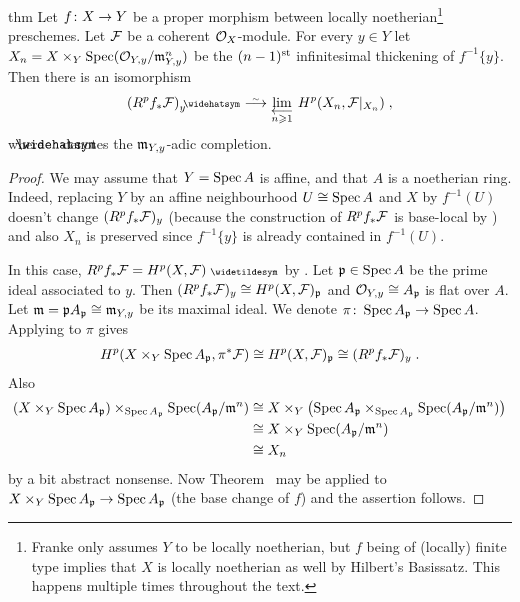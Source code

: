 \documentclass[a4paper,parskip=half,numbers=enddot, DIV=12]{scrreprt}
\renewcommand{\geq}{\geqslant}
\begin{document}
\begin{varthm}{thm}
	Let $f\colon X\morphism Y$ be a proper morphism between locally noetherian\footnote{Franke only assumes $Y$ to be locally noetherian, but $f$ being of (locally) finite type implies that $X$ is locally noetherian as well by Hilbert's Basissatz. This happens multiple times throughout the text.} preschemes. Let $\mathcal{F}$ be a coherent $\mathcal{O}_X$-module. For every $y\in Y$ let $X_n=X\times_Y\operatorname{Spec} (\mathcal{O}_{Y,y}/\mathfrak{m}_{Y,y}^n)$ be the $(n-1)^{\text{st}}$ infinitesimal thickening of $f^{-1}\{y\}$. Then there is an isomorphism
	\begin{align*}
		(R^pf_*\Ff)_y^\complete\isomorphism\limit[n\geq 1] H^p(X_n,\Ff|_{X_n})\;,
	\end{align*}
	where $\roof{\phantom{x}}$ denotes the $\mathfrak{m}_{Y,y}$-adic completion.
\end{varthm}
\begin{proof}
	We may assume that $Y=\operatorname{Spec} A$ is affine, and that $A$ is a noetherian ring. Indeed, replacing $Y$ by an affine neighbourhood $U\cong \operatorname{Spec} A$ and $X$ by $f^{-1}(U)$ doesn't change $(R^pf_*\mathcal{F})_y$ (because the construction of $R^pf_*\mathcal{F}$ is base-local by \cite[Proposition~1.5.1]{alggeo2}) and also $X_n$ is preserved since $f^{-1}\{y\}$ is already contained in $f^{-1}(U)$.
	
	In this case, $R^pf_*\Ff=H^p(X,\Ff)^\qcmod$ by \cite[Proposition~1.5.1]{alggeo2}. Let $\mathfrak{p}\in\operatorname{Spec} A$ be the prime ideal associated to $y$. Then $(R^pf_*\mathcal{F})_y\cong H^p(X,\mathcal{F})_{\mathfrak{p}}$ and $\mathcal{O}_{Y,y}\cong A_{\mathfrak{p}}$ is flat over $A$. Let $\mathfrak{m}=\mathfrak{p} A_{\mathfrak{p}}\cong \mathfrak{m}_{Y,y}$ be its maximal ideal. We denote $\pi\colon \Spec A_\pp\morphism \Spec A$. Applying \cite[Fact~4.1.1]{alggeo2} to $\pi$ gives 
	\begin{align*}
		H^p(X\times_Y\operatorname{Spec} A_{\mathfrak{p}},\pi^*\mathcal{F})\cong H^p(X,\mathcal{F})_{\mathfrak{p}}\cong (R^pf_*\mathcal{F})_y\;.
	\end{align*}
	Also
	\begin{align*}
		\left(X\times_Y\operatorname{Spec} A_{\mathfrak{p}}\right)\times_{\operatorname{Spec} A_{\mathfrak{p}}}\operatorname{Spec}(A_{\mathfrak{p}}/\mathfrak{m}^n)&\cong X\times_Y\left(\operatorname{Spec} A_{\mathfrak{p}}\times_{\operatorname{Spec} A_{\mathfrak{p}}}\operatorname{Spec} (A_{\mathfrak{p}}/\mathfrak{m}^n)\right)\\
		&\cong X\times_Y\operatorname{Spec}(A_{\mathfrak{p}}/\mathfrak{m}^n)\\
		&\cong X_n
	\end{align*}
	by a bit abstract nonsense. Now Theorem~ may be applied to $X\times_Y\Spec A_\pp\morphism \Spec A_\pp$ (the base change of $f$) and the assertion follows.
\end{proof}
\end{document}
